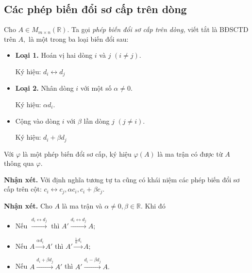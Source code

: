 \subsection{Các phép biến đổi sơ cấp trên dòng}
Cho $A \in M_{m \times n} \left( {\mathbb{R}} \right).$ Ta gọi \textit{phép biến đổi sơ cấp trên dòng,} viết tắt là BĐSCTD trên $A,$ là một trong ba loại biến đổi sau:
\begin{itemize}
\item \textbf{Loại 1.} Hoán vị hai dòng $i$ và $j$ $\left( {i \ne j} \right).$\\
\centerline{Ký hiệu: $d_i \leftrightarrow d_j$}
\item \textbf{Loại 2.} Nhân dòng $i$ với một số $\alpha \ne 0.$\\
\centerline{Ký hiệu: $\alpha d_i.$}
\item Cộng vào dòng $i$ với $\beta$ lần dòng $j$ $\left( {j \ne i} \right).$\\
\centerline{Ký hiệu: $d_i + \beta d_j$}
\end{itemize}
Với $\varphi$ là một phép biến đổi sơ cấp, ký hiệu $\varphi \left( A \right)$ là ma trận có được từ $A$ thông qua $\varphi.$
\begin{mybox}
\textbf{Nhận xét.} Với định nghĩa tương tự ta cũng có khái niệm các phép biến đổi sơ cấp trên cột: ${c_i} \leftrightarrow {c_j},\alpha {c_i},{c_i} + \beta {c_j}.$
\end{mybox}
\begin{mybox}
\textbf{Nhận xét.} Cho $A$ là ma trận và $\alpha \ne 0, \beta \in \mathbb{R}.$ Khi đó
\begin{itemize}
\item Nếu $\mathop  \to \limits^{{d_i} \leftrightarrow {d_j}} $ thì $A'\mathop  \to \limits^{{d_i} \leftrightarrow {d_j}} A;$
\item Nếu $A\mathop  \to \limits^{\alpha {d_i}} A'$ thì $A'\mathop  \to \limits^{\frac{1}{\alpha }{d_i}} A;$
\item Nếu $A\mathop  \to \limits^{{d_i} + \beta {d_j}} A'$ thì $A'\mathop  \to \limits^{{d_i} - \beta {d_j}} A.$
\end{itemize} 
\end{mybox}
